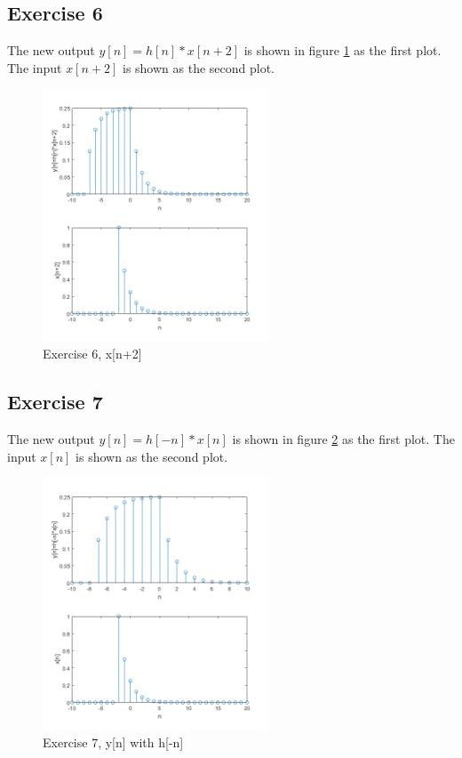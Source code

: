 \documentclass[a4paper]{article}
\begin{document}
\subsection{Exercise 6}
The new output $y[n] = h[n]*x[n+2]$ is shown in figure \ref{fig:5} as the first plot. The input $x[n+2]$ is shown as the second plot.
\begin{figure}
    \centering
    \includegraphics[width=0.6\textwidth]{5.png}
    \caption{Exercise 6, x[n+2]}
    \label{fig:5}
\end{figure}

\subsection{Exercise 7}
The new output $y[n] = h[-n]*x[n]$ is shown in figure \ref{fig:6} as the first plot. The input $x[n]$ is shown as the second plot.
\begin{figure}
    \centering
    \includegraphics[width=0.6\textwidth]{6.png}
    \caption{Exercise 7, y[n] with h[-n]}
    \label{fig:6}
\end{figure}
\end{document}
